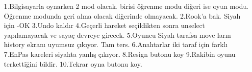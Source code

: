 ﻿1.Bilgisayarla oynarken 2 mod olacak. birisi öğrenme modu diğeri ise oyun modu. Öğrenme modunda geri alma olacak diğerinde olmayacak.
2.Rook'a bak. Siyah için -OK
3.Undo kaldır
4.Geçerli hareket seçildikten sonra unselect yapılamayacak ve sayaç devreye girecek. 
5.Oyuncu Siyah tarafsa move ların history ekranı uyumsuz çıkıyor. Tam ters.
6.Anahtarlar iki taraf için farklı
7.EnPas kareleri siyahta yanlış çıkıyor.
8.Resign butonu koy
9.Rakibin oyunu terkettiğini bildir.
10.Tekrar oyna butonu koy.